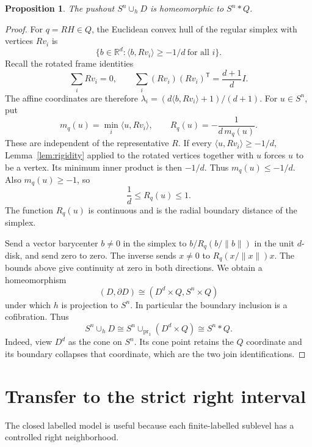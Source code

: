 \documentclass[11pt,a4paper]{article}
\newtheorem{proposition}[theorem]{Proposition}
\theoremstyle{definition}
\newcommand{\R}{\mathbb R}
\begin{document}
\begin{proposition}\label{prop:join}
The pushout \(S^n\cup_h D\) is homeomorphic to \(S^n*Q\).
\end{proposition}
\begin{proof}
For \(q=RH\in Q\), the Euclidean convex hull of the regular simplex with vertices \(Rv_i\) is
\[
\{b\in\R^d:\langle b,Rv_i\rangle\geq-1/d\ \text{for all }i\}.
\]
Recall the rotated frame identities
\[
\sum_i Rv_i=0,\qquad
\sum_i (Rv_i)(Rv_i)^{\mathsf T}=\frac{d+1}{d}I.
\]
The affine coordinates are therefore
\(\lambda_i=(d\langle b,Rv_i\rangle+1)/(d+1)\).
For \(u\in S^n\), put
\[
m_q(u)=\min_i\langle u,Rv_i\rangle,\qquad
R_q(u)=-\frac1{d\,m_q(u)}.
\]
These are independent of the representative \(R\).
If every \(\langle u,Rv_i\rangle\geq-1/d\), Lemma~\ref{lem:rigidity} applied to the rotated vertices together with \(u\) forces \(u\) to be a vertex. Its minimum inner product is then \(-1/d\). Thus \(m_q(u)\leq-1/d\). Also \(m_q(u)\geq-1\), so
\[
\frac1d\leq R_q(u)\leq1.
\]
The function \(R_q(u)\) is continuous and is the radial boundary distance of the simplex.

Send a vector barycenter \(b\ne0\) in the simplex to
\(b/R_q(b/\|b\|)\) in the unit \(d\)-disk, and send zero to zero. The inverse sends \(x\ne0\) to \(R_q(x/\|x\|)x\).
The bounds above give continuity at zero in both directions. We obtain a homeomorphism
\[
(D,\partial D)\cong(D^d\times Q,S^n\times Q)
\]
under which \(h\) is projection to \(S^n\). In particular the boundary inclusion is a cofibration.
Thus
\[
S^n\cup_h D\cong
S^n\cup_{\operatorname{pr}_1}(D^d\times Q)\cong S^n*Q.
\]
Indeed, view \(D^d\) as the cone on \(S^n\). Its cone point retains the \(Q\) coordinate and its boundary collapses that coordinate, which are the two join identifications.
\end{proof}

\section{Transfer to the strict right interval}
The closed labelled model is useful because each finite-labelled sublevel has a controlled right neighborhood.
\end{document}
